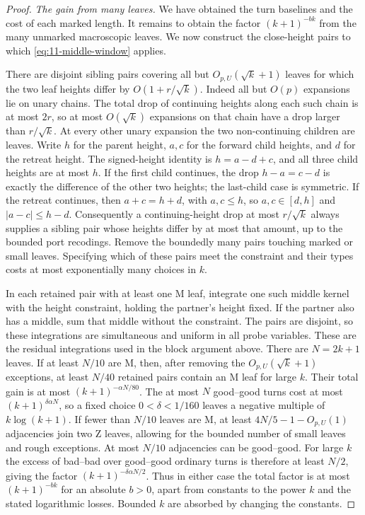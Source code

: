 \begin{proof}
\smallskip\noindent\emph{The gain from many leaves.}
We have obtained the turn baselines and the cost of each marked
length. It remains to obtain the factor $(k+1)^{-bk}$ from the many
unmarked macroscopic leaves. We now construct the close-height pairs
to which \eqref{eq:11-middle-window} applies.

There are disjoint sibling pairs covering all but
$O_{p,U}(\sqrt{k}+1)$ leaves for which the two leaf heights differ by
$O(1+r/\sqrt{k})$. Indeed all but $O(p)$ expansions lie on unary
chains. The total drop of continuing heights along each such chain
is at most $2r$, so at most $O(\sqrt{k})$ expansions on that chain
have a drop larger than $r/\sqrt{k}$. At every other unary expansion
the two non-continuing children are
leaves. Write $h$ for the parent height, $a,c$ for the forward child
heights, and $d$ for the retreat height. The signed-height identity is
$h=a-d+c$, and all three child heights are at most $h$.
If the first child continues, the drop $h-a=c-d$ is exactly the
difference of the other two heights; the last-child case is symmetric.
If the retreat continues, then $a+c=h+d$, with $a,c\le h$, so
$a,c\in[d,h]$ and $|a-c|\le h-d$. Consequently a continuing-height
drop at most $r/\sqrt{k}$ always supplies a sibling pair whose heights
differ by at most that amount, up to the bounded port recodings. Remove
the boundedly many pairs touching marked or small leaves. Specifying
which of these pairs meet the constraint and their types costs at
most exponentially many choices in $k$.

In each retained pair with at least one $\mathrm M$ leaf, integrate
one such middle kernel with the height constraint, holding the
partner's height fixed. If the partner also has a middle, sum that
middle without the constraint. The pairs
are disjoint, so these integrations are simultaneous and uniform in
all probe variables. These are the residual integrations used in
the block argument above. There are $N=2k+1$ leaves. If at least $N/10$ are $\mathrm M$,
then, after removing the $O_{p,U}(\sqrt{k}+1)$ exceptions, at least
$N/40$ retained pairs contain an $\mathrm M$ leaf for large $k$.
Their total gain is at most $(k+1)^{-\alpha N/80}$. The at most $N$
good--good turns cost at most $(k+1)^{\delta\alpha N}$, so a fixed
choice $0<\delta<1/160$ leaves a negative multiple of $k\log(k+1)$.
If fewer than $N/10$ leaves are $\mathrm M$, at least
$4N/5-1-O_{p,U}(1)$ adjacencies join two $\mathrm Z$ leaves,
allowing for the bounded number of small leaves and rough exceptions. At most $N/10$ adjacencies can be good--good.
For large $k$ the excess of bad--bad over good--good ordinary turns
is therefore at least $N/2$, giving the factor
$(k+1)^{-\delta\alpha N/2}$.
Thus in either case the total factor
is at most $(k+1)^{-bk}$ for an absolute $b>0$, apart from constants
to the power $k$ and the stated logarithmic losses. Bounded $k$ are
absorbed by changing the constants.


\end{proof}
